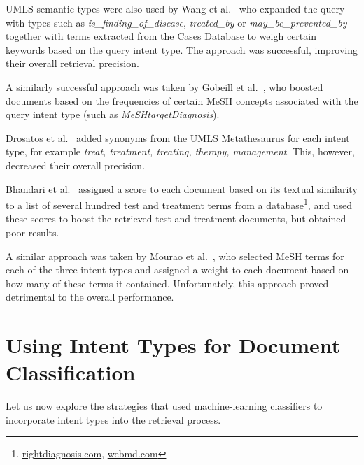 UMLS semantic types were also used by Wang et al.\ \cite{udel} who expanded the query
with types such as \emph{is\_finding\_of\_disease}, \emph{treated\_by} or
\emph{may\_be\_prevented\_by} together with terms extracted from the Cases Database to weigh certain keywords
based on the query intent type. The approach was successful, improving their overall retrieval precision.

A similarly successful approach was taken by Gobeill et al.\ \cite{bitem}, who boosted documents based on the
frequencies of certain MeSH
concepts associated with the query intent type (such as \emph{MeSHtargetDiagnosis}).

Drosatos et al.\ \cite{duth} added synonyms from the UMLS Metathesaurus for each intent type, for example
\emph{treat, treatment, treating, therapy, management}. This, however, decreased their overall precision.

Bhandari et al.\ \cite{ir.cs.sfsu} assigned a score to each document based on
its textual similarity to a list of several hundred test and treatment terms from a database\footnote{\url{rightdiagnosis.com}, \url{webmd.com}},
and used these scores to boost the retrieved test and treatment documents, but obtained poor results.

A similar approach was taken by Mourao et al.\ \cite{novasearch}, who selected MeSH
terms for each of the three intent types and assigned a weight to each
document based on how many of these terms it contained. Unfortunately, this approach proved detrimental to
the overall performance.
%

\section{Using Intent Types for Document Classification}\label{related-intent-type}
Let us now explore the strategies that used machine-learning classifiers to
incorporate intent types into the retrieval process.

